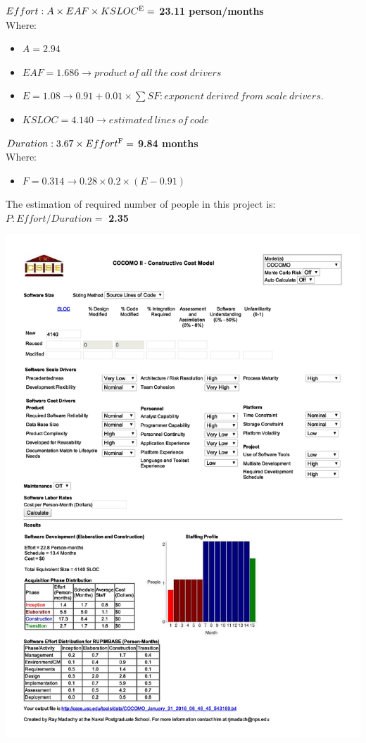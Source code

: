 $ Effort : A \times EAF \times KSLOC\textsuperscript{E} =$ \textbf{23.11 person/months}\\
Where:
\begin{itemize}
	\item $A = 2.94$
	\item $EAF = 1.686 \rightarrow product\ of\ all\ the\ cost\ drivers$
	\item $E = 1.08 \rightarrow 0.91 + 0.01 \times \sum SF : exponent\ derived\ from\ scale\ drivers. $
	\item $KSLOC = 4.140 \rightarrow estimated\ lines\ of\ code $
\end{itemize}
\vspace{10mm}
$ Duration : 3.67 \times Effort\textsuperscript{F} =$ \textbf{9.84 months}\\
Where:
\begin{itemize}
	\item $F = 0.314 \rightarrow 0.28 \times 0.2 \times (E - 0.91)$ 
\end{itemize}
\vspace{10mm}
The estimation of required number of people in this project is:\\
$P : Effort/Duration =$ \textbf{2.35} 

\begin{center}
	\includegraphics[width=\textwidth]{COCOMO/cocomo.jpg}
\end{center}